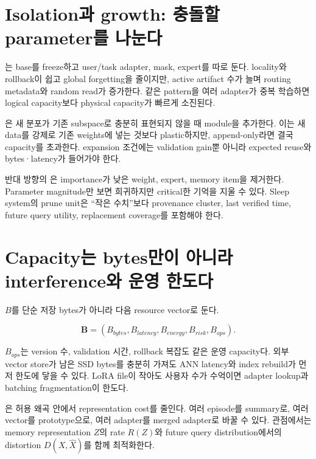 \section{Isolation과 growth: 충돌할 parameter를 나눈다}

는 base를 freeze하고 user/task adapter, mask, expert를
따로 둔다. locality와 rollback이 쉽고 global forgetting을 줄이지만, active artifact 수가 늘며 routing
metadata와 random read가 증가한다. 같은 pattern을 여러 adapter가 중복 학습하면 logical capacity보다
physical capacity가 빠르게 소진된다.

은 새 분포가 기존 subspace로 충분히 표현되지 않을 때 module을
추가한다. 이는 새 data를 강제로 기존 weights에 넣는 것보다 plastic하지만, append-only라면 결국
capacity를 초과한다. expansion 조건에는 validation gain뿐 아니라 expected reuse와 bytes·latency가
들어가야 한다.

반대 방향의 은 importance가 낮은 weight, expert, memory item을 제거한다.
Parameter magnitude만 보면 희귀하지만 critical한 기억을 지울 수 있다. Sleep system의 prune unit은
``작은 수치''보다 provenance cluster, last verified time, future query utility, replacement coverage를
포함해야 한다.

\section{Capacity는 bytes만이 아니라 interference와 운영 한도다}

 $B$를 단순 저장 bytes가 아니라 다음 resource vector로 둔다.

\begin{equation}
\mathbf{B}=(B_{bytes}, B_{latency}, B_{energy}, B_{risk}, B_{ops}).
\end{equation}

$B_{ops}$는 version 수, validation 시간, rollback 복잡도 같은 운영 capacity다. 외부 vector store가
남은 SSD bytes를 충분히 가져도 ANN latency와 index rebuild가 먼저 한도에 닿을 수 있다. LoRA file이
작아도 사용자 수가 수억이면 adapter lookup과 batching fragmentation이 한도다.

은 허용 왜곡 안에서 representation cost를 줄인다. 여러 episode를 summary로,
여러 vector를 prototype으로, 여러 adapter를 merged adapter로 바꿀 수 있다. 
관점에서는 memory representation $Z$의 rate $R(Z)$와 future query distribution에서의 distortion
$D(X,\hat X)$를 함께 최적화한다.

